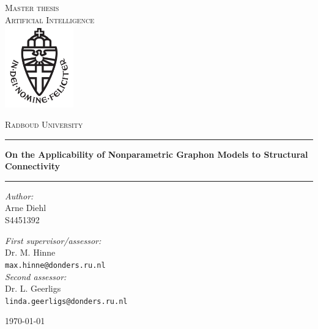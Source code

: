 \documentclass[11pt]{report} %
\begin{document}
\begin{titlepage}
\begin{center}
\textsc{\LARGE Master thesis\\Artificial Intelligence}\\[1.5cm]
\includegraphics[height=100pt]{logo}

\vspace{0.4cm}
\textsc{\Large Radboud University}\\[1cm]
\hrule
\vspace{0.4cm}
\textbf{\huge 
On the Applicability of Nonparametric Graphon Models to Structural Connectivity
}\\%
\vspace{0.4cm}
\hrule
\vspace{2cm}
\begin{minipage}[t]{0.45\textwidth}
\begin{flushleft} \large
\textit{Author:}\\
Arne Diehl\\
S4451392
\end{flushleft}
\end{minipage}
\begin{minipage}[t]{0.45\textwidth}
\begin{flushright} \large
\textit{First supervisor/assessor:}\\
Dr. M. Hinne\\
\texttt{max.hinne@donders.ru.nl}\\[1.3cm]
\textit{Second assessor:}\\
Dr. L. Geerligs\\
\texttt{linda.geerligs@donders.ru.nl}
\end{flushright}
\end{minipage}
\vfill
{\large \today}
\end{center}
\end{titlepage}
\end{document}
